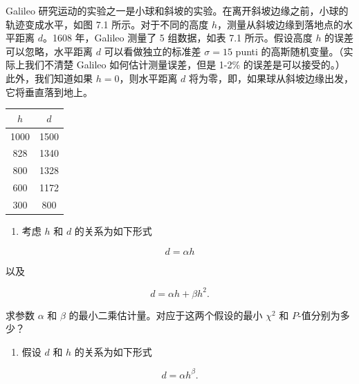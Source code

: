 ﻿





\begin{question}
Galileo
研究运动的实验之一是小球和斜坡的实验。在离开斜坡边缘之前，小球的轨迹变成水平，如图
7.1 所示。对于不同的高度 \(h\)，测量从斜坡边缘到落地点的水平距离
\(d\)。1608 年，Galileo 测量了 5 组数据，如表 7.1 所示。假设高度 \(h\)
的误差可以忽略，水平距离 \(d\) 可以看做独立的标准差 \(\sigma=15\) punti
的高斯随机变量。（实际上我们不清楚 Galileo 如何估计测量误差，但是 1-2\%
的误差是可以接受的。）此外，我们知道如果 \(h=0\)，则水平距离 \(d\)
将为零，即，如果球从斜坡边缘出发，它将垂直落到地上。


\begin{center}
\begin{tabular}{cc}
\toprule
\(h\) & \(d\) \\
\midrule
1000 & 1500 \\
828 & 1340 \\
800 & 1328 \\
600 & 1172 \\
300 & 800 \\
\bottomrule
\end{tabular}
\par{}
\end{center}

\begin{enumerate}
\item
  考虑 \(h\) 和 \(d\) 的关系为如下形式
\end{enumerate}

\[
d=\alpha h
\]

以及

\[
d=\alpha h+\beta h^2.
\]

求参数 \(\alpha\) 和 \(\beta\) 的最小二乘估计量。对应于这两个假设的最小
\(\chi^2\) 和 \(P\)-值分别为多少？

\begin{enumerate}[start=2]
\item
  假设 \(d\) 和 \(h\) 的关系为如下形式
\end{enumerate}

\[
d=\alpha h^\beta.
\]


\end{question}
